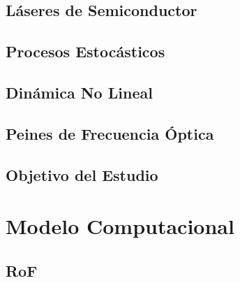 \documentclass[a4paper, 11pt, oneside]{book}
\begin{document}

				\section{Láseres de Semiconductor}
					

				\section{Procesos Estocásticos}
					

				\section{Dinámica No Lineal}
					
%
				\section{Peines de Frecuencia Óptica}
					
					

				\section{Objetivo del Estudio}
					
				
			\chapter{Modelo Computacional}

				\section{RoF}
				
\end{document}
